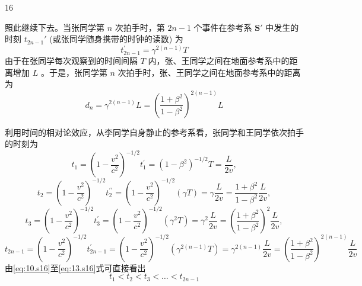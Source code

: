 \begin{solution}{16}
\begin{subsolution}
照此继续下去。当张同学第 $n$ 次拍手时，第 $2n - 1$ 个事件在参考系 $\mathbf{S}'$ 中发生的时刻 $t_{2n - 1}'$ (或张同学随身携带的时钟的读数) 为
\begin{equation}
t _ {2 n - 1} ^ {\prime} = \gamma^ {2 (n - 1)} T
\label{eq:8.s16}
\end{equation}
由于在张同学每次观察到的时间间隔 $T$ 内，张、王同学之间在地面参考系中的距离增加 $L$ 。于是，张同学第 $n$ 次拍手时，张、王同学之间在地面参考系中的距离为
\begin{equation}
d _ {n} = \gamma^ {2 (n - 1)} L = \left(\frac {1 + \beta^ {2}}{1 - \beta^ {2}}\right) ^ {2 (n - 1)} L
\label{eq:9.s16}
\end{equation}
\end{subsolution}

\begin{subsolution}
利用时间的相对论效应，从李同学自身静止的参考系看，张同学和王同学依次拍手的时刻为
\begin{equation}
t _ {1} = \left(1 - \frac {v ^ {2}}{c ^ {2}}\right) ^ {- 1 / 2} t _ {1} ^ {\prime} = \left(1 - \beta^ {2}\right) ^ {- 1 / 2} T = \frac {L}{2 v},
\label{eq:10.s16}
\end{equation}
\begin{equation}
t _ {2} = \left(1 - \frac {v ^ {2}}{c ^ {2}}\right) ^ {- 1 / 2} t _ {2} ^ {\prime \prime} = \left(1 - \frac {v ^ {2}}{c ^ {2}}\right) ^ {- 1 / 2} (\gamma T) = \gamma \frac {L}{2 v} = \frac {1 + \beta^ {2}}{1 - \beta^ {2}} \frac {L}{2 v},
\label{eq:11.s16}
\end{equation}
\begin{equation}
t _ {3} = \left(1 - \frac {v ^ {2}}{c ^ {2}}\right) ^ {- 1 / 2} t _ {3} ^ {\prime} = \left(1 - \frac {v ^ {2}}{c ^ {2}}\right) ^ {- 1 / 2} (\gamma^ {2} T) = \gamma^ {2} \frac {L}{2 v} = \left(\frac {1 + \beta^ {2}}{1 - \beta^ {2}}\right) ^ {2} \frac {L}{2 v},
\label{eq:12.s16}
\end{equation}
\begin{equation}
t _ {2 n - 1} = \left(1 - \frac {v ^ {2}}{c ^ {2}}\right) ^ {- 1 / 2} t _ {2 n - 1} ^ {\prime} = \left(1 - \frac {v ^ {2}}{c ^ {2}}\right) ^ {- 1 / 2} (\gamma^ {2 (n - 1)} T) = \gamma^ {2 (n - 1)} \frac {L}{2 v} = \left(\frac {1 + \beta^ {2}}{1 - \beta^ {2}}\right) ^ {2 (n - 1)} \frac {L}{2 v}
\label{eq:13.s16}
\end{equation}
由\eqref{eq:10.s16}至\eqref{eq:13.s16}式可直接看出
\begin{equation}
t _ {1} < t _ {2} < t _ {3} < \dots < t _ {2 n - 1}
\label{eq:14.s16}
\end{equation}
\end{subsolution}
\end{solution}